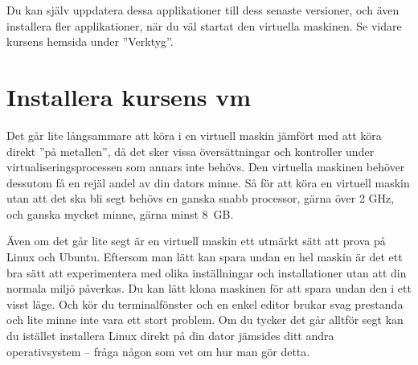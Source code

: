 Du kan själv uppdatera dessa applikationer till dess senaste versioner, och även installera fler applikationer, när du väl startat den virtuella maskinen. Se vidare kursens hemsida under ''Verktyg''.

\section{Installera kursens vm}

Det går lite långsammare att köra i en virtuell maskin jämfört med att köra direkt ''på metallen'', då det sker vissa översättningar och kontroller under virtualiseringsprocessen som annars inte behövs. Den virtuella maskinen behöver dessutom få en rejäl andel av din dators minne. Så för att köra en virtuell maskin utan att det ska bli segt behövs en ganska snabb processor, gärna över 2 GHz, och ganska mycket minne, gärna minst 8~GB. 

Även om det går lite segt är en virtuell maskin ett utmärkt sätt att prova på Linux och Ubuntu. Eftersom man lätt kan spara undan en hel maskin är det ett bra sätt att experimentera med olika inställningar och installationer utan att din normala miljö påverkas. Du kan lätt klona maskinen för att spara undan den i ett visst läge. Och kör du terminalfönster och en enkel editor brukar svag prestanda och lite minne inte vara ett stort problem. Om du tycker det går alltför segt kan du istället installera Linux direkt på din dator jämsides ditt andra operativsystem -- fråga någon som vet om hur man gör detta. 

